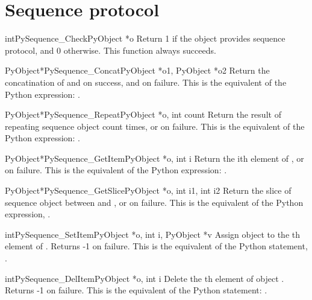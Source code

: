 \section{Sequence protocol}

     \begin{cfuncdesc}{int}{PySequence_Check}{PyObject *o}
         Return 1 if the object provides sequence protocol, and 0
	 otherwise.  
	 This function always succeeds.
     \end{cfuncdesc}


     \begin{cfuncdesc}{PyObject*}{PySequence_Concat}{PyObject *o1, PyObject *o2}
	 Return the concatination of  and  on success, and {\NULL} on
	 failure.   This is the equivalent of the Python
	 expression: .
     \end{cfuncdesc}


     \begin{cfuncdesc}{PyObject*}{PySequence_Repeat}{PyObject *o, int count}
	 Return the result of repeating sequence object  count times,
	 or {\NULL} on failure.  This is the equivalent of the Python
	 expression: .
     \end{cfuncdesc}


     \begin{cfuncdesc}{PyObject*}{PySequence_GetItem}{PyObject *o, int i}
	 Return the ith element of , or {\NULL} on failure. This is the
	 equivalent of the Python expression: .
     \end{cfuncdesc}


     \begin{cfuncdesc}{PyObject*}{PySequence_GetSlice}{PyObject *o, int i1, int i2}
	 Return the slice of sequence object  between  and , or
	 {\NULL} on failure. This is the equivalent of the Python
	 expression, .
     \end{cfuncdesc}


     \begin{cfuncdesc}{int}{PySequence_SetItem}{PyObject *o, int i, PyObject *v}
	 Assign object  to the th element of .
Returns -1 on failure.  This is the equivalent of the Python
	 statement, .
     \end{cfuncdesc}

     \begin{cfuncdesc}{int}{PySequence_DelItem}{PyObject *o, int i}
	 Delete the th element of object .  Returns
	 -1 on failure.  This is the equivalent of the Python
	 statement: .
     \end{cfuncdesc}

